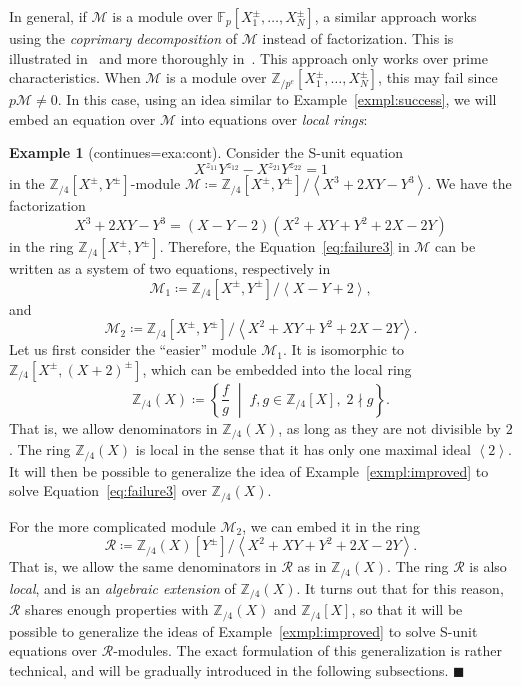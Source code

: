 \documentclass[letterpaper, 11pt, thm-restate]{article}
\numberwithin{equation}{section}
\newcommand{\Z}{\mathbb{Z}}
\newcommand{\F}{\mathbb{F}}
\newcommand{\Zpe}{\mathbb{Z}_{/p^e}}
\newcommand{\mM}{\mathcal{M}}
\newcommand{\mR}{\mathcal{R}}
\newcommand{\gen}[1]{\left\langle {#1} \right\rangle}
\theoremstyle{definition}
\theoremstyle{definition}
\newtheorem{exmpl}[thrm]{Example}
\theoremstyle{definition}
\begin{document}
In general, if $\mM$ is a module over $\F_p[X_1^{\pm}, \ldots, X_N^{\pm}]$, a similar approach works using the \emph{coprimary decomposition} of $\mM$ instead of factorization.
This is illustrated in~\cite[Section~9]{derksen2007skolem} and more thoroughly in~\cite{dong2024submonoid}.
This approach only works over prime characteristics.
When $\mM$ is a module over $\Zpe[X_1^{\pm}, \ldots, X_N^{\pm}]$, this may fail since $p \mM \neq 0$.
In this case, using an idea similar to Example~\ref{exmpl:success}, we will embed an equation over $\mM$ into equations over \emph{local rings}:

\renewcommand\thmcontinues[1]{continued}
\begin{exmpl}[continues=exa:cont]
    Consider the S-unit equation 
    \begin{equation}\label{eq:failure3}
        X^{z_{11}}Y^{z_{12}} - X^{z_{21}}Y^{z_{22}} = 1
    \end{equation}
    in the $\Z_{/4}[X^{\pm}, Y^{\pm}]$-module
    $
    \mM \coloneqq \Z_{/4}[X^{\pm}, Y^{\pm}]/\gen{X^3 + 2XY - Y^3}.
    $
    We have the factorization 
    \[
    X^3 + 2XY - Y^3 = (X - Y - 2)(X^2 + XY + Y^2 + 2X - 2Y)
    \]
    in the ring $\Z_{/4}[X^{\pm}, Y^{\pm}]$.
    Therefore, the Equation~\eqref{eq:failure3} in $\mM$ can be written as a system of two equations, respectively in
    \[
    \mM_1 \coloneqq \Z_{/4}[X^{\pm}, Y^{\pm}] \big/ \gen{X - Y + 2},
    \]
    and
    \[
    \mM_2 \coloneqq \Z_{/4}[X^{\pm}, Y^{\pm}] \big/ \gen{X^2 + XY + Y^2 + 2X - 2Y}.
    \]
    Let us first consider the ``easier'' module $\mM_1$.
    It is isomorphic to $\Z_{/4}[X^{\pm}, (X+2)^{\pm}]$, which can be embedded into the local ring
    \[
    \Z_{/4}(X) \coloneqq \left\{\frac{f}{g} \;\middle|\; f, g \in \Z_{/4}[X],\; 2 \nmid g \right\}.
    \]
    That is, we allow denominators in $\Z_{/4}(X)$, as long as they are not divisible by $2$.
    The ring $\Z_{/4}(X)$ is local in the sense that it has only one maximal ideal $\gen{2}$.
    It will then be possible to generalize the idea of Example~\ref{exmpl:improved} to solve Equation~\eqref{eq:failure3} over $\Z_{/4}(X)$.

    For the more complicated module $\mM_2$, we can embed it in the ring
    \[
    \mR \coloneqq \Z_{/4}(X)[Y^{\pm}] \big/ \gen{X^2 + XY + Y^2 + 2X - 2Y}.
    \]
    That is, we allow the same denominators in $\mR$ as in $\Z_{/4}(X)$.
    The ring $\mR$ is also \emph{local}, and is an \emph{algebraic extension} of $\Z_{/4}(X)$.
    It turns out that for this reason, $\mR$ shares enough properties with $\Z_{/4}(X)$ and $\Z_{/4}[X]$, so that it will be possible to generalize the ideas of Example~\ref{exmpl:improved} to solve S-unit equations over $\mR$-modules.
    The exact formulation of this generalization is rather technical, and will be gradually introduced in the following subsections.
    \hfill $\blacksquare$
\end{exmpl}
\end{document}
